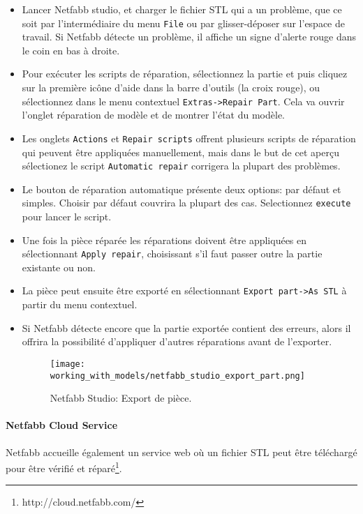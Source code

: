\begin{itemize}
	\item Lancer Netfabb studio, et charger le fichier STL qui a un probl\`eme, que ce soit par l'interm\'ediaire du menu \texttt{File} ou par glisser-d\'eposer sur l'espace de travail. Si Netfabb d\'etecte un probl\`eme, il affiche un signe d'alerte rouge dans le coin en bas \`a droite.
	\item Pour ex\'ecuter les scripts de r\'eparation, s\'electionnez la partie et puis cliquez sur la premi\`ere ic\^one d'aide dans la barre d'outils (la croix rouge), ou s\'electionnez dans le menu contextuel \texttt{Extras->Repair Part}.  Cela va ouvrir l'onglet r\'eparation de mod\`ele et de montrer l'\'etat du mod\`ele.
	\item Les onglets \texttt{Actions} et \texttt{Repair scripts} offrent plusieurs scripts de r\'eparation qui peuvent \^etre appliqu\'ees manuellement, mais dans le but de cet aperçu s\'electionez le script \texttt{Automatic repair} corrigera la plupart des probl\`emes.
	\item Le bouton de r\'eparation automatique pr\'esente deux options: par d\'efaut et simples. Choisir par d\'efaut couvrira la plupart des cas. Selectionnez \texttt{execute} pour lancer le script.
	\item Une fois la pi\`ece r\'epar\'ee les r\'eparations doivent \^etre appliqu\'ees en s\'electionnant \texttt{Apply repair}, choisissant s'il faut passer outre la partie existante ou non.
	\item La pi\`ece peut ensuite \^etre export\'e en s\'electionnant \texttt{Export part->As STL} \`a partir du menu contextuel.
	\item Si Netfabb d\'etecte encore que la partie export\'ee contient des erreurs, alors il offrira la possibilit\'e d'appliquer d'autres r\'eparations avant de l'exporter.
	\begin{figure}[H]
	\centering
	\texttt{[image: working\_with\_models/netfabb\_studio\_export\_part.png]}
	\caption{Netfabb Studio: Export de pi\`ece.}
	\label{fig:netfabb_studio_export_part}
	\end{figure}
\end{itemize}

\paragraph{Netfabb Cloud Service} %
\label{par:netfabb_cloud_service}
Netfabb accueille \'egalement un service web o\`u un fichier STL peut \^etre t\'el\'echarg\'e pour \^etre v\'erifi\'e et r\'epar\'e\footnote{http://cloud.netfabb.com/}.  

